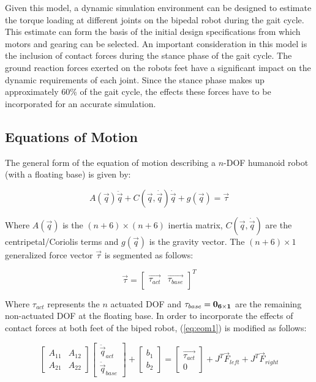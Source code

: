 Given this model, a dynamic simulation environment can be designed to estimate the torque loading at different joints on the bipedal robot during the gait cycle. This estimate can form the basis of the initial design specifications from which motors and gearing can be selected. An important consideration in this model is the inclusion of contact forces during the stance phase of the gait cycle. The ground reaction forces exerted on the robots feet have a significant impact on the dynamic requirements of each joint. Since the stance phase makes up approximately 60\% of the gait cycle, the effects these forces have to be incorporated for an accurate simulation. 

\subsection{Equations of Motion} %
\label{sec:forward_dynamics}

The general form of the equation of motion describing a $n$-DOF humanoid robot (with a floating base) is given by: 

\begin{equation}
	\label{eq:eom1}
	A(\vec{q})\ddot{\vec{q}} + C(\vec{q},\dot{\vec{q}})\dot{\vec{q}} + g(\vec{q}) = \vec{\tau}
\end{equation}

Where $A(\vec{q})$ is the $(n+6) \times (n+6)$ inertia matrix, $C(\vec{q},\dot{\vec{q}})$ are the centripetal/Coriolis terms and $g(\vec{q})$ is the gravity vector. The $(n+6) \times 1$ generalized force vector $\vec{\tau}$ is segmented as follows:

\begin{equation}
	\label{eq:gentau}
	\vec{\tau} = {\begin{bmatrix} \vec{\tau_{act}} & \vec{\tau_{base}} \\ \end{bmatrix}}^T
\end{equation}

Where $\tau_{act}$ represents the $n$ actuated DOF and $\tau_{base} = \bf{0}_{6 \times 1} $ are the remaining non-actuated DOF at the floating base. In order to incorporate the effects of contact forces at both feet of the biped robot, (\ref{eq:eom1}) is modified as follows: 

\begin{equation}
	\label{eq:eom2}
	\begin{bmatrix} A_{11} & A_{12} \\ A_{21} & A_{22} \end{bmatrix} 
	\begin{bmatrix} \ddot{\vec{q}}_{act} \\ \ddot{\vec{q}}_{base} \end{bmatrix} + 
	\begin{bmatrix} b_{1} \\ b_{2} \end{bmatrix} = 
	\begin{bmatrix} \vec{\tau_{act}} \\ 0 \end{bmatrix} + 
    J^{T}\vec{F}_{left} + J^{T}\vec{F}_{right}
\end{equation}

